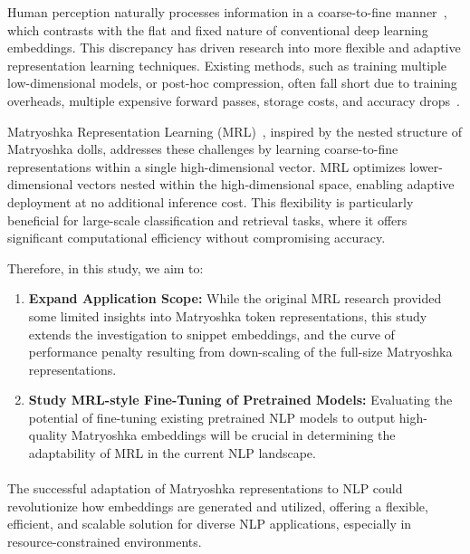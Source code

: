 \documentclass[12pt]{article}
\begin{document}
Human perception naturally processes information in a coarse-to-fine manner~\cite{HARRIS2000601}, which contrasts with the flat and fixed nature of conventional deep learning embeddings. This discrepancy has driven research into more flexible and adaptive representation learning techniques. Existing methods, such as training multiple low-dimensional models, or post-hoc compression, often fall short due to training overheads, multiple expensive forward passes, storage costs, and accuracy drops~\cite{NEURIPS2022_c32319f4}.

Matryoshka Representation Learning (MRL)~\cite{NEURIPS2022_c32319f4}, inspired by the nested structure of Matryoshka dolls, addresses these challenges by learning coarse-to-fine representations within a single high-dimensional vector. MRL optimizes lower-dimensional vectors nested within the high-dimensional space, enabling adaptive deployment at no additional inference cost. This flexibility is particularly beneficial for large-scale classification and retrieval tasks, where it offers significant computational efficiency without compromising accuracy.

Therefore, in this study, we aim to:

\begin{enumerate}
    \item \textbf{Expand Application Scope:} While the original MRL research provided some limited insights into Matryoshka token representations, this study extends the investigation to snippet embeddings, and the curve of performance penalty resulting from down-scaling of the full-size Matryoshka representations.

    \item \textbf{Study MRL-style Fine-Tuning of Pretrained Models:} Evaluating the potential of fine-tuning existing pretrained NLP models to output high-quality Matryoshka embeddings will be crucial in determining the adaptability of MRL in the current NLP landscape.
\end{enumerate}

\paragraph{}
The successful adaptation of Matryoshka representations to NLP could revolutionize how embeddings are generated and utilized, offering a flexible, efficient, and scalable solution for diverse NLP applications, especially in resource-constrained environments.
\end{document}
